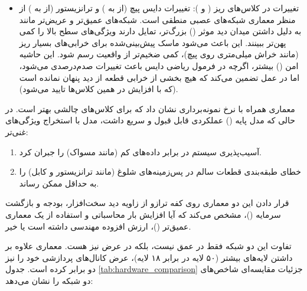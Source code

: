 \documentclass{article}
\begin{document}
\begin{itemize}
\begin{itemize}
		\item تغییرات  در کلاس‌های ریز ( و ): تغییرات دایس پیچ (از  به ) و ترانزیستور (از  به ) از منظر معماری شبکه‌های عصبی منطقی است. شبکه‌های عمیق‌تر و عریض‌تر مانند  به دلیل داشتن میدان دید موثر () بزرگ‌تر، تمایل دارند ویژگی‌های سطح بالا را کمی پهن‌تر ببینند. این باعث می‌شود ماسک پیش‌بینی‌شده برای خرابی‌های بسیار ریز (مانند خراش میلی‌متری روی پیچ)، کمی ضخیم‌تر از واقعیت رسم شود. این حاشیه امن () بیشتر، اگرچه در فرمول ریاضی دایس باعث تغییرات صدم‌درصدی می‌شود، اما در عمل تضمین می‌کند که هیچ بخشی از خرابی قطعه از دید پنهان نمانده است (که با افزایش  در همین کلاس‌ها تایید می‌شود).
	\end{itemize}
\end{itemize}


معماری  همراه با نرخ نمونه‌برداری  نشان داد که برای کلاس‌های چالشی بهتر است. در حالی که مدل پایه () عملکردی قابل قبول و سریع داشت، مدل  با استخراج ویژگی‌های غنی‌تر:

\begin{enumerate}
	\item آسیب‌پذیری سیستم در برابر داده‌های کم (مانند مسواک) را جبران کرد.
	\item خطای طبقه‌بندی قطعات سالم در پس‌زمینه‌های شلوغ (مانند ترانزیستور و کابل) را به حداقل ممکن رساند.
\end{enumerate}



قرار دادن این دو معماری روی کفه ترازو از زاویه دید سخت‌افزار، بودجه و بازگشت سرمایه ()، مشخص می‌کند که آیا افزایش بار محاسباتی و استفاده از یک معماری عمیق‌تر ()، ارزش افزوده مهندسی داشته است یا خیر.

تفاوت این دو شبکه فقط در عمق نیست، بلکه در عرض نیز هست. معماری  علاوه بر داشتن لایه‌های بیشتر (۵۰ لایه در برابر ۱۸ لایه)، عرض کانال‌های پردازشی خود را نیز دو برابر کرده است. جدول \ref{tab:hardware_comparison} جزئیات مقایسه‌ای شاخص‌های دو شبکه را نشان می‌دهد:
\end{document}
